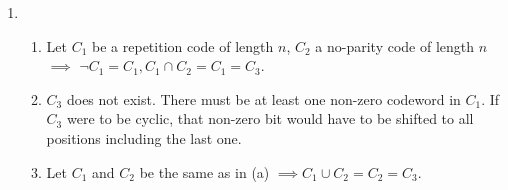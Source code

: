 \documentclass[a4paper,9pt]{extarticle}
\begin{document}
\begin{enumerate}
  \item
    \begin{enumerate}
      \item
        Let $C_1$ be a repetition code of length $n$, $C_2$ a no-parity code of length $n$ $\implies$ $\neg C_1=C_1, C_1\cap C_2=C_1=C_3$.
      \item
        $C_3$ does not exist. There must be at least one non-zero codeword in $C_1$. If $C_3$ were to be cyclic, that non-zero bit would have to be shifted to all positions including the last one.
      \item
        Let $C_1$ and $C_2$ be the same as in (a) $\implies C_1 \cup C_2=C_2=C_3$.
    \end{enumerate}
\end{enumerate}
\end{document}
